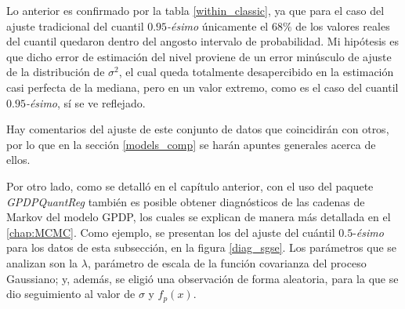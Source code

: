 Lo anterior es confirmado por la tabla \ref{within_classic}, ya que para el caso del ajuste tradicional del cuantil $0.95$\textit{-\'esimo} \'unicamente el $68\%$ de los valores reales del cuantil quedaron dentro del angosto intervalo de probabilidad. Mi hip\'otesis es que dicho error de estimaci\'on del nivel proviene de un error min\'usculo de ajuste de la distribuci\'on de $\sigma^2$, el cual queda totalmente desapercibido en la estimaci\'on casi perfecta de la mediana, pero en un valor extremo, como es el caso del cuantil $0.95$\textit{-\'esimo}, s\'i se ve reflejado.

Hay comentarios del ajuste de este conjunto de datos que coincidir\'an con otros, por lo que en la secci\'on \ref{models_comp} se har\'an apuntes generales acerca de ellos.

Por otro lado, como se detall\'o en el cap\'itulo anterior, con el uso del paquete \textit{GPDPQuantReg} tambi\'en es posible obtener diagn\'osticos de las cadenas de Markov del modelo GPDP, los cuales se explican de manera m\'as detallada en el \autoref{chap:MCMC}. Como ejemplo, se presentan los del ajuste del cu\'antil $0.5$-\textit{\'esimo} para los datos de esta subsecci\'on, en la figura \ref{diag_sgse}. Los par\'ametros que se analizan son la $\lambda$, par\'ametro de escala de la funci\'on covarianza del proceso Gaussiano; y, adem\'as, se eligi\'o una observaci\'on de forma aleatoria, para la que se dio seguimiento al valor de $\sigma$ y $f_p(x)$. 

